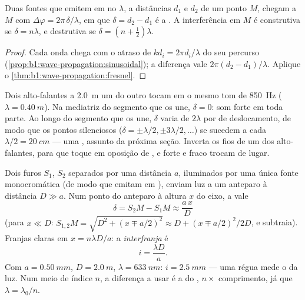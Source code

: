 \begin{proposition}\label{prop:b1:wave-propagation:pathdiff}
Duas fontes que emitem em  no  $\lambda$, a distâncias
$d_1$ e $d_2$ de um ponto $M$, chegam a $M$ com
$\Delta\varphi = 2\pi\,\delta/\lambda$, em que $\delta = d_2 - d_1$ é a
\emph{}. A interferência em $M$ é construtiva se
$\delta = n\lambda$, e destrutiva se $\delta = (n + \tfrac12)\lambda$.
\end{proposition}

\begin{proof}
Cada onda chega com o atraso de  $kd_i = 2\pi d_i/\lambda$ do seu
percurso (\cref{prop:b1:wave-propagation:sinusoidal}); a diferença vale
$2\pi(d_2 - d_1)/\lambda$. Aplique o \cref{thm:b1:wave-propagation:fresnel}.
\end{proof}

\begin{example}\label{ex:b1:wave-propagation:speakers}
Dois alto-falantes a \qty{2.0}{m} um do outro tocam em  o mesmo tom de \qty{850}{Hz}
($\lambda = \qty{0.40}{m}$). Na mediatriz do segmento que os une,
$\delta = 0$: som forte em toda parte. Ao longo do segmento que os une, $\delta$
varia de $2\lambda$ por  de deslocamento, de modo que os pontos silenciosos
($\delta = \pm\lambda/2, \pm 3\lambda/2, \dots$) se sucedem a cada
$\lambda/2 = \qty{20}{cm}$ --- uma , assunto da próxima
seção. Inverta os fios de um dos alto-falantes, para que toque em oposição de , e forte
e fraco trocam de lugar.
\end{example}

\begin{example}\label{ex:b1:wave-propagation:young}
Dois furos $S_1$, $S_2$ separados por uma distância $a$, iluminados por uma única
fonte monocromática (de modo que emitam em ), enviam luz a um
anteparo à distância $D \gg a$. Num ponto do anteparo à altura $x$
do eixo, a  vale
\[
\delta = S_2M - S_1M \approx \frac{a\,x}{D}
\]
(para $x \ll D$: $S_{1,2}M = \sqrt{D^2 + (x \mp a/2)^2} \approx D +
(x \mp a/2)^2/2D$, e subtraia). Franjas claras em $x = n\lambda D/a$:
a \emph{interfranja} é
\[
i = \frac{\lambda D}{a} .
\]
Com $a = \qty{0.50}{mm}$, $D = \qty{2.0}{m}$, $\lambda = \qty{633}{nm}$:
$i = \qty{2.5}{mm}$ --- uma régua mede o  da luz. Num
meio de índice $n$, a diferença a usar é a do \emph{}, $n \times$ comprimento, já que $\lambda = \lambda_0/n$.
\end{example}

